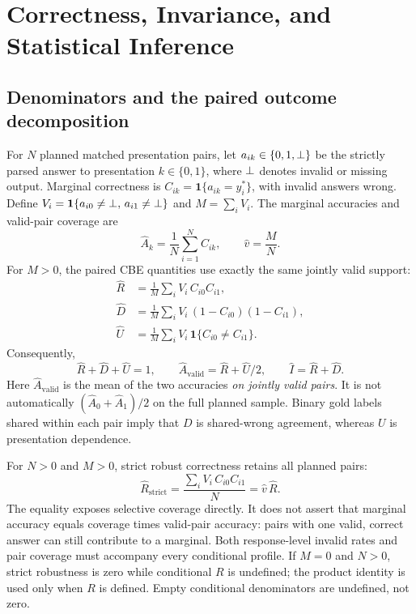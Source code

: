 \section{Correctness, Invariance, and Statistical Inference}
\label{sec:statistics}

\subsection{Denominators and the paired outcome decomposition}

For $N$ planned matched presentation pairs, let $a_{ik} \in \{0, 1, \bot\}$ be the strictly parsed answer
to presentation $k \in \{0, 1\}$, where $\bot$ denotes invalid or missing output. Marginal correctness is
$C_{ik} = \mathbf{1}\{a_{ik} = y_i^{*}\}$, with invalid answers wrong. Define
$V_i = \mathbf{1}\{a_{i0} \ne \bot,\, a_{i1} \ne \bot\}$ and $M = \sum_i V_i$. The marginal accuracies
and valid-pair coverage are
\begin{equation}
  \widehat{A}_k = \frac{1}{N} \sum_{i=1}^{N} C_{ik},
  \qquad
  \widehat{v} = \frac{M}{N}.
  \label{eq:marginals}
\end{equation}
For $M > 0$, the paired CBE quantities use exactly the same jointly valid support:
\begin{align}
  \widehat{R} &= \frac{1}{M} \sum_i V_i\, C_{i0} C_{i1}, \label{eq:R}\\
  \widehat{D} &= \frac{1}{M} \sum_i V_i\, (1 - C_{i0})(1 - C_{i1}), \label{eq:D}\\
  \widehat{U} &= \frac{1}{M} \sum_i V_i\, \mathbf{1}\{C_{i0} \ne C_{i1}\}. \label{eq:U}
\end{align}
Consequently,
\begin{equation}
  \widehat{R} + \widehat{D} + \widehat{U} = 1,
  \qquad
  \widehat{A}_{\mathrm{valid}} = \widehat{R} + \widehat{U}/2,
  \qquad
  \widehat{I} = \widehat{R} + \widehat{D}.
  \label{eq:identities}
\end{equation}
Here $\widehat{A}_{\mathrm{valid}}$ is the mean of the two accuracies \emph{on jointly valid pairs}. It is
not automatically $(\widehat{A}_0 + \widehat{A}_1)/2$ on the full planned sample. Binary gold labels shared
within each pair imply that $D$ is shared-wrong agreement, whereas $U$ is presentation dependence.

For $N > 0$ and $M > 0$, strict robust correctness retains all planned pairs:
\begin{equation}
  \widehat{R}_{\mathrm{strict}} = \frac{\sum_i V_i\, C_{i0} C_{i1}}{N} = \widehat{v}\, \widehat{R}.
  \label{eq:strict}
\end{equation}
The equality exposes selective coverage directly. It does not assert that marginal accuracy equals coverage
times valid-pair accuracy: pairs with one valid, correct answer can still contribute to a marginal. Both
response-level invalid rates and pair coverage must accompany every conditional profile. If $M = 0$ and
$N > 0$, strict robustness is zero while conditional $R$ is undefined; the product identity is used only
when $R$ is defined. Empty conditional denominators are undefined, not zero.


